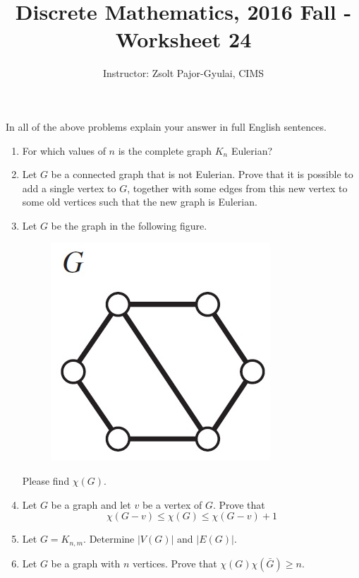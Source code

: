 \documentclass[11pt]{preprint}
\title{Discrete Mathematics, 2016 Fall - Worksheet 24}
\author{Instructor: Zsolt Pajor-Gyulai, CIMS}
\def\enumb{\begin{enumerate}}
\def\enume{\end{enumerate}}
\begin{document}
\maketitle

In all of the above problems explain your answer in full English sentences.

\enumb
\item For which values of $n$ is the complete graph $K_n$ Eulerian?
\item Let $G$ be a connected graph that is not Eulerian. Prove that it is possible to add a single vertex to $G$, together with some edges from this new vertex to some old vertices such that the new graph is Eulerian.

\item Let $G$ be the graph in the following figure.
\begin{figure}[ht]
\centering
\includegraphics[scale=0.5]{Color1.jpg}
\end{figure}
Please find $\chi(G)$.
\item Let $G$ be a graph and let $v$ be a vertex of $G$. Prove that
\[
\chi(G-v)\leq \chi(G)\leq \chi(G-v)+1
\]
\item Let $G=K_{n,m}$. Determine $|V(G)|$ and $|E(G)|$.
\item Let $G$ be a graph with $n$ vertices. Prove that $\chi(G)\chi(\bar{G})\geq n$.
\enume
\end{document}
